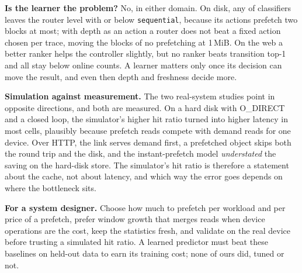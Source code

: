 \textbf{Is the learner the problem?} No, in either domain. On disk, any of
\clfRouterClassifiers{} classifiers leaves the router level with or below
\texttt{sequential}, because its actions prefetch two blocks at most; with
depth as an action a router does not beat a fixed action chosen per trace,
moving \hsrMovedRatioRoutedHitOneMiB{} the blocks of no prefetching at 1\,MiB.
On the web a better ranker helps the controller slightly, but no ranker beats
transition top-1 and all stay below online counts. A learner matters only once its decision
can move the result, and even then depth and freshness decide more.

\textbf{Simulation against measurement.} The two real-system studies point in
opposite directions, and both are measured. On a hard disk with O\_DIRECT and
a closed loop, the simulator's higher hit ratio turned into higher latency in
most cells,
plausibly because prefetch reads compete with demand reads for one device.
Over HTTP, the link serves demand first, a prefetched object skips both the
round trip and the disk, and the instant-prefetch model \emph{understated}
the saving on the hard-disk store.
The simulator's hit ratio is therefore a statement about the cache, not about
latency, and which way the error goes depends on where the bottleneck sits.

\textbf{For a system designer.} Choose how much to prefetch per workload and
per price of a prefetch, prefer window growth that merges reads when device
operations are the cost, keep the statistics fresh, and validate on the real
device before trusting a simulated hit ratio. A learned predictor must beat
these baselines on held-out data to earn its training cost; none of ours did,
tuned or not.
